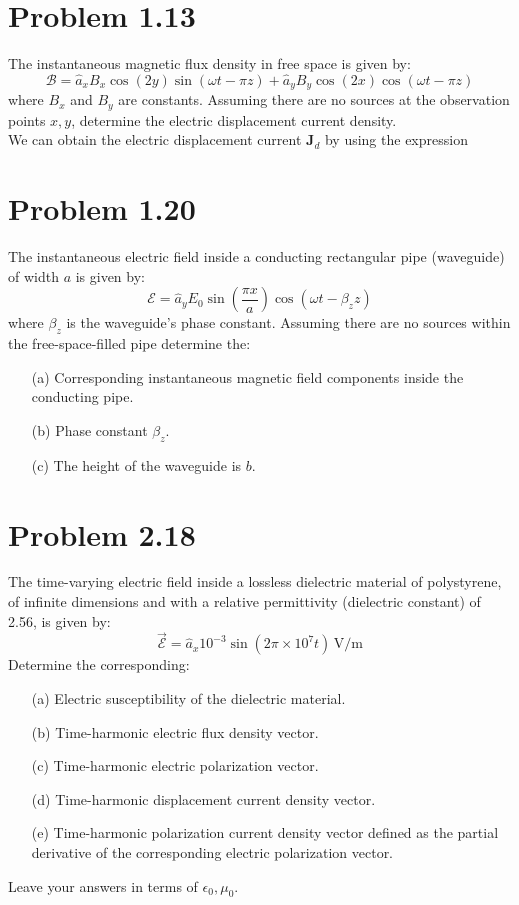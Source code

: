 \documentclass[12pt]{article}
\begin{document}
\section*{Problem 1.13}
The instantaneous magnetic flux density in free space is given by:
\[
{\bm{\mathcal{B}}} = \hat{a}_x B_x \cos(2y) \sin(\omega t - \pi z) + \hat{a}_y B_y \cos(2x) \cos(\omega t - \pi z)
\]
where \( B_x \) and \( B_y \) are constants. Assuming there are no sources at the observation points \( x, y \), determine the electric displacement current density.\\
  We can obtain the electric displacement current $\bm{J}_d$ by using the expression  

\section*{Problem 1.20}
The instantaneous electric field inside a conducting rectangular pipe (waveguide) of width \( a \) is given by:
\[
\bm{\mathcal{E}} = \hat{a}_y E_0 \sin\left(\frac{\pi x}{a}\right) \cos(\omega t - \beta_z z)
\]
where \( \beta_z \) is the waveguide's phase constant. Assuming there are no sources within the free-space-filled pipe determine the:
\begin{itemize}
\item[(a)] Corresponding instantaneous magnetic field components inside the conducting pipe.\\
\item[(b)] Phase constant \( \beta_z \).
\item[(c)] The height of the waveguide is \( b \).
\end{itemize}

    
\section*{Problem 2.18}
The time-varying electric field inside a lossless dielectric material of polystyrene, of infinite dimensions and with a relative permittivity (dielectric constant) of 2.56, is given by:
\[
\vec{\mathcal{E}} = \hat{a}_x 10^{-3} \sin(2\pi \times 10^7 t) \, \text{V/m}
\]
Determine the corresponding:
\begin{itemize}
    \item[(a)] Electric susceptibility of the dielectric material.
    \item[(b)] Time-harmonic electric flux density vector.
    \item[(c)] Time-harmonic electric polarization vector.
    \item[(d)] Time-harmonic displacement current density vector.
    \item[(e)] Time-harmonic polarization current density vector defined as the partial derivative of the corresponding electric polarization vector.
\end{itemize}
Leave your answers in terms of \( \epsilon_0, \mu_0 \).
\end{document}
